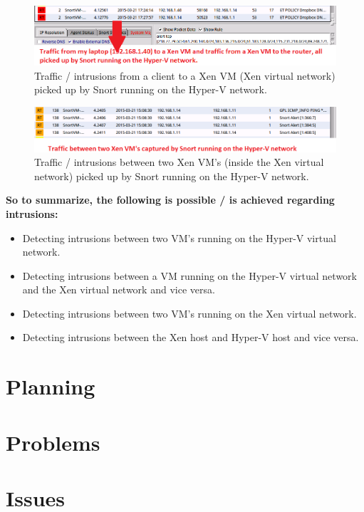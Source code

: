 \documentclass[11pt, a4paper]{article}
\begin{document}
\begin{figure}[h]
    \centering
    \includegraphics[width=1\textwidth]{Snort_17.png}
   \caption{Traffic / intrusions from a client to a Xen VM (Xen virtual network) picked up by Snort running on the Hyper-V network.}
\end{figure}
\begin{figure}[h]
    \centering
    \includegraphics[width=1\textwidth]{Snort_8.png}
   \caption{Traffic / intrusions between two Xen VM's (inside the Xen virtual network) picked up by Snort running on the Hyper-V network.}
\end{figure}
\clearpage
\textbf{So to summarize, the following is possible / is achieved regarding intrusions:}
\begin{itemize}
\item Detecting intrusions between two VM's running on the Hyper-V virtual network.
\item Detecting intrusions between a VM running on the Hyper-V virtual network and the Xen virtual network and vice versa.
\item Detecting intrusions between two VM's running on the Xen virtual network.
\item Detecting intrusions between the Xen host and Hyper-V host and vice versa.
\end{itemize}
\section*{Planning}
 



\section*{Problems}



\section*{Issues}
\end{document}
